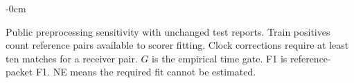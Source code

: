 \begin{table}[!t]\begin{adjustwidth}{-\extralength}{0cm}
\caption{Public preprocessing sensitivity with unchanged test reports. Train positives count reference pairs available to scorer fitting. Clock corrections require at least ten matches for a receiver pair. $G$ is the empirical time gate. F1 is reference-packet F1. NE means the required fit cannot be estimated.}\label{tab:review_public}
\small\setlength{\tabcolsep}{3pt}
\end{adjustwidth}\end{table}


\FloatBarrier

